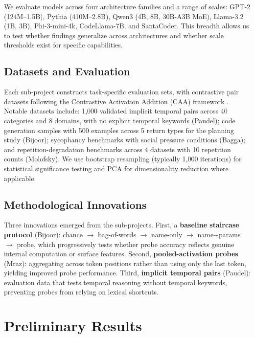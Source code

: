\documentclass[midterm]{sparreport}
\begin{document}
We evaluate models across four architecture families and a range of scales: GPT-2 (124M--1.5B), Pythia (410M--2.8B), Qwen3 (4B, 8B, 30B-A3B MoE), Llama-3.2 (1B, 3B), Phi-3-mini-4k, CodeLlama-7B, and SantaCoder. This breadth allows us to test whether findings generalize across architectures and whether scale thresholds exist for specific capabilities.

\subsection{Datasets and Evaluation}

Each sub-project constructs task-specific evaluation sets, with contrastive pair datasets following the Contrastive Activation Addition (CAA) framework \cite{rimsky2024steering}. Notable datasets include: 1,000 validated implicit temporal pairs across 40 categories and 8 domains, with no explicit temporal keywords (Paudel); code generation samples with 500 examples across 5 return types for the planning study (Bijoor); sycophancy benchmarks with social pressure conditions (Bagga); and repetition-degradation benchmarks across 4 datasets with 10 repetition counts (Molofsky). We use bootstrap resampling (typically 1,000 iterations) for statistical significance testing and PCA for dimensionality reduction where applicable.

\subsection{Methodological Innovations}

Three innovations emerged from the sub-projects. First, a \textbf{baseline staircase protocol} (Bijoor): chance $\to$ bag-of-words $\to$ name-only $\to$ name+params $\to$ probe, which progressively tests whether probe accuracy reflects genuine internal computation or surface features. Second, \textbf{pooled-activation probes} (Mraz): aggregating across token positions rather than using only the last token, yielding improved probe performance. Third, \textbf{implicit temporal pairs} (Paudel): evaluation data that tests temporal reasoning without temporal keywords, preventing probes from relying on lexical shortcuts.

\section{Preliminary Results}
\end{document}
